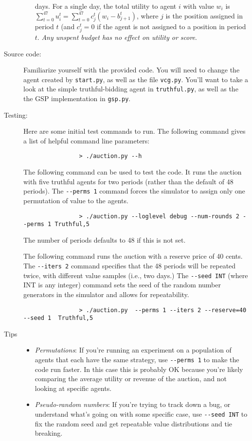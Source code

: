 \documentclass[11pt]{article}
\begin{document}
\begin{description}
\begin{itemize}
  days.  For a single day, the total utility to agent $i$ with value
  $w_i$ is $\sum_{t=0}^{47} u_i^t = \sum_{t=0}^{47} c_j^t(w_i -
  b_{j+1}^t)$, where $j$ is the position assigned in period $t$ (and
  $c_j^t=0$ if the agent is not assigned to a position in period $t$.
{\em Any unspent  budget has no effect on utility or score}.
			\end{itemize}
%
		\item[Source code:] Familiarize yourself with the provided code. You will need to change the agent created by \verb+start.py+, as well as the file \verb+vcg.py+. You'll want to take a look at the simple truthful-bidding agent in \verb+truthful.py+, as well as the the GSP implementation in \verb+gsp.py+.

		\item[Testing:] Here are some initial test commands to run. The following command gives a list of helpful command line parameters:
			\begin{verbatim}
				> ./auction.py --h
			\end{verbatim}

			The following command can be used to test the code. It runs the auction with five truthful agents for two periods (rather than the default of 48 periods). The \verb+--perms 1+ command forces the simulator to assign only one permutation of value to the agents.
			\begin{verbatim}
				> ./auction.py --loglevel debug --num-rounds 2 --perms 1 Truthful,5
			\end{verbatim}

The number of periods defaults to 48 if this is not set.

The following command runs the auction with a reserve price of 40
cents. The \verb+--iters 2+ command specifies that the 48 periods will
be repeated twice, with different value samples (i.e., two days.)
%
The
%
\verb+--seed INT+ (where INT is any integer) command
 sets the seed of the random number generators in the simulator and
allows for repeatability.
%
			\begin{verbatim}
				> ./auction.py  --perms 1 --iters 2 --reserve=40 --seed 1  Truthful,5
			\end{verbatim}


		\item[Tips]
			\begin{itemize}
				\item {\em Permutations}: If you're
running an experiment on a population of agents that each have the
same strategy,
use \verb+--perms 1+ to make the code run faster. In this case this is
probably OK because you're likely comparing the average utility or
revenue of the auction, and not looking at specific agents.
%
				\item {\em Pseudo-random numbers}: If you're trying to track down a bug, or understand what's going on with some specific case, use \verb+--seed INT+ to fix the random seed and get repeatable value distributions and tie breaking.
			\end{itemize}


\end{description}
\end{document}
